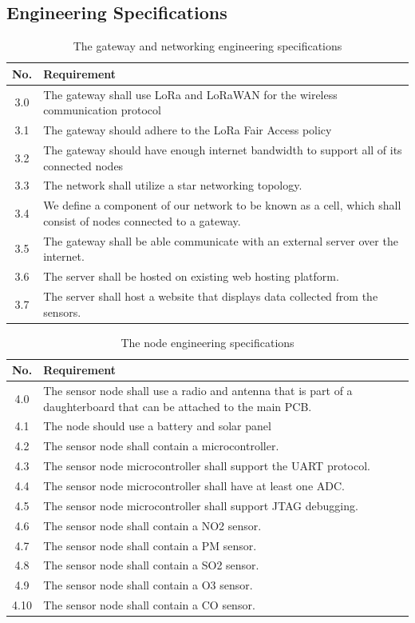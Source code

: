 \documentclass[titlepage, 11pt, letterpaper]{article}
\begin{document}
\subsection{Engineering Specifications}
\begin{table}[H]
\centering
\caption{The gateway and networking engineering specifications}
\begin{tabularx}{\linewidth}{|c|X|}
\hline
No. & Requirement \\
\hline\hline
3.0 & The gateway shall use LoRa and LoRaWAN for the wireless communication protocol \\\hline
3.1 & The gateway should adhere to the LoRa Fair Access policy \\\hline
3.2 & The gateway should have enough internet bandwidth to support all of its connected nodes \\\hline
3.3 & The network shall utilize a star networking topology.\\\hline
3.4 & We define a component of our network to be known as a cell, which shall consist of nodes connected to a gateway. \\\hline
3.5 & The gateway shall be able communicate with an external server over the internet.\\\hline
3.6 & The server shall be hosted on existing web hosting platform.\\\hline
3.7 & The server shall host a website that displays data collected from the sensors.\\\hline
\end{tabularx}
\label{tab:networkingSpecs}
\end{table}

\begin{table}[H]
\centering
\caption{The node engineering specifications}
\begin{tabularx}{\linewidth}{|c|X|}
\hline
No. & Requirement \\
\hline\hline
4.0 & The sensor node shall use a radio and antenna that is part of a daughterboard that can be attached to the main PCB.\\\hline
4.1 & The node should use a battery and solar panel \\\hline
4.2 & The sensor node shall contain a microcontroller. \\\hline
4.3 & The sensor node microcontroller shall support the UART protocol.\\\hline
4.4 & The sensor node microcontroller shall have at least one ADC.\\\hline
4.5 & The sensor node microcontroller shall support JTAG debugging.\\\hline
4.6 & The sensor node shall contain a NO2 sensor.\\\hline
4.7 & The sensor node shall contain a PM sensor.\\\hline
4.8 & The sensor node shall contain a SO2 sensor.\\\hline
4.9 & The sensor node shall contain a O3 sensor.\\\hline
4.10 & The sensor node shall contain a CO sensor.\\\hline
\end{tabularx}
\label{tab:nodeSpecs}
\end{table}
\end{document}

